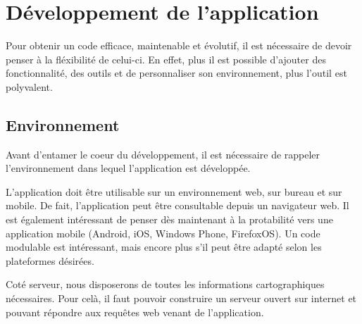 
\section{Développement de l'application}


Pour obtenir un code efficace, maintenable et évolutif, il est nécessaire de devoir penser à la fléxibilité de celui-ci. En effet, plus il est possible d'ajouter des fonctionnalité, des outils et de personnaliser son environnement, plus l'outil est polyvalent.



\subsection{Environnement}


Avant d'entamer le coeur du développement, il est nécessaire de rappeler l'environnement dans lequel l'application est développée. 

L'application doit être utilisable sur un environnement web, sur bureau et sur mobile. De fait, l'application peut être consultable depuis un navigateur web. Il est également intéressant de penser dès maintenant à la protabilité vers une application mobile (Android, iOS, Windows Phone, FirefoxOS). Un code modulable est intéressant, mais encore plus s'il peut être adapté selon les plateformes désirées.

Coté serveur, nous disposerons de toutes les informations cartographiques nécessaires. Pour celà, il faut pouvoir construire un serveur ouvert sur internet et pouvant répondre aux requêtes web venant de l'application.

